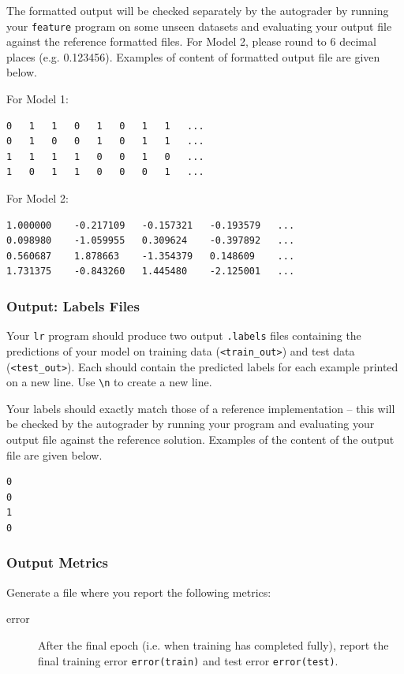 \documentclass[11pt,addpoints,answers]{exam}
\begin{document}
The formatted output will be checked separately by the autograder by running your \lstinline{feature} program on some unseen datasets and evaluating your output file against the reference formatted files. For Model 2, please round to 6 decimal places (e.g. 0.123456). Examples of content of formatted output file are given below.

For Model 1:
\begin{lstlisting}
0	1	1	0	1	0	1	1	...
0	1	0	0	1	0	1	1	...
1	1	1	1	0	0	1	0	...
1	0	1	1	0	0	0	1	...
\end{lstlisting}
For Model 2:
\begin{lstlisting}
1.000000	-0.217109	-0.157321	-0.193579	...
0.098980	-1.059955	0.309624	-0.397892	...
0.560687	1.878663	-1.354379	0.148609	...
1.731375	-0.843260	1.445480	-2.125001	...
\end{lstlisting}



\subsubsection{Output: Labels Files} \label{output}
Your \lstinline{lr} program should produce two output \texttt{.labels} files containing the predictions of your model on training data (\texttt{<train\_out>}) and test data (\texttt{<test\_out>}). Each should contain the predicted labels for each example printed on a new line. Use \lstinline{\n} to create a new line. 

Your labels should exactly match those of a reference implementation -- this will be checked by the autograder by running your program and evaluating your output file against the reference solution. Examples of the content of the output file are given below.

\begin{lstlisting}
0
0
1
0
\end{lstlisting}

\subsubsection{Output Metrics} \label{metrics}
Generate a file where you report the following metrics: 

\begin{description}

\item[error] After the final epoch (i.e. when training has completed fully), report the final training error \newline \lstinline{error(train)} and test error \lstinline{error(test)}. 
\end{description}
\end{document}
